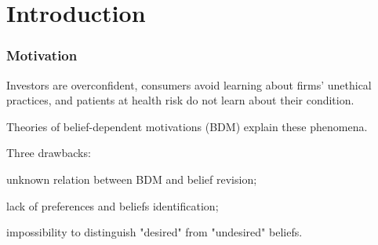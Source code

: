 \documentclass[usenames,dvipsnames,aspectratio=169,11pt, envcountsect, handout]{beamer}
\begin{document}
\section{Introduction}

\begin{frame}
	\maketitle

\end{frame}

\begin{frame}\frametitle{Motivation}

	Investors are overconfident, consumers avoid learning about firms' unethical practices, and patients at health risk do not learn about their condition.

	\vfill

	Theories of belief-dependent motivations (BDM) explain these phenomena.

	\vfill

	Three drawbacks:

	\vfill

	\begin{wideitemize}
		\item unknown relation between BDM and belief revision;
		\item lack of preferences and beliefs identification;
		\item impossibility to distinguish "desired" from "undesired" beliefs.
	\end{wideitemize}


\end{frame}
\end{document}
